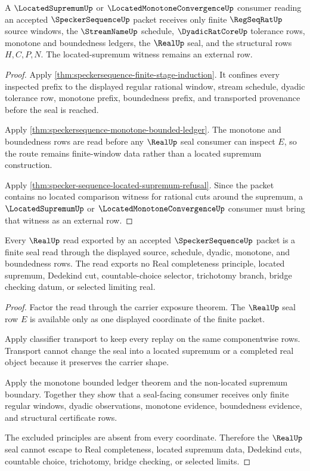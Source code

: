 \begin{theorem}
\label{thm:specker-sequence-located-supremum-consumer-boundary}
A $\LocatedSupremumUp$ or $\LocatedMonotoneConvergenceUp$ consumer reading an accepted $\SpeckerSequenceUp$ packet receives only finite $\RegSeqRatUp$ source windows, the $\StreamNameUp$ schedule, $\DyadicRatCoreUp$ tolerance rows, monotone and boundedness ledgers, the $\RealUp$ seal, and the structural rows $H,C,P,N$. The located-supremum witness remains an external row.
\end{theorem}
\begin{proof}
Apply \autoref{thm:speckersequence-finite-stage-induction}. It confines every inspected prefix to the displayed regular rational window, stream schedule, dyadic tolerance row, monotone prefix, boundedness prefix, and transported provenance before the seal is reached.

Apply \autoref{thm:speckersequence-monotone-bounded-ledger}. The monotone and boundedness rows are read before any $\RealUp$ seal consumer can inspect $E$, so the route remains finite-window data rather than a located supremum construction.

Apply \autoref{thm:specker-sequence-located-supremum-refusal}. Since the packet contains no located comparison witness for rational cuts around the supremum, a $\LocatedSupremumUp$ or $\LocatedMonotoneConvergenceUp$ consumer must bring that witness as an external row.
\end{proof}

\begin{theorem}
\label{thm:speckersequence-realup-seal-nonescape}
Every $\RealUp$ read exported by an accepted $\SpeckerSequenceUp$ packet is a finite seal read through the displayed source, schedule, dyadic, monotone, and boundedness rows. The read exports no Real completeness principle, located supremum, Dedekind cut, countable-choice selector, trichotomy branch, bridge checking datum, or selected limiting real.
\end{theorem}
\begin{proof}
Factor the read through the carrier exposure theorem. The $\RealUp$ seal row $E$ is available only as one displayed coordinate of the finite packet.

Apply classifier transport to keep every replay on the same componentwise rows. Transport cannot change the seal into a located supremum or a completed real object because it preserves the carrier shape.

Apply the monotone bounded ledger theorem and the non-located supremum boundary. Together they show that a seal-facing consumer receives only finite regular windows, dyadic observations, monotone evidence, boundedness evidence, and structural certificate rows.

The excluded principles are absent from every coordinate. Therefore the $\RealUp$ seal cannot escape to Real completeness, located supremum data, Dedekind cuts, countable choice, trichotomy, bridge checking, or selected limits.
\end{proof}


